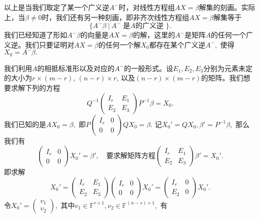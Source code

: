 \vspace{0.5em}

以上是当我们取定了某一个广义逆$A^-$时，对线性方程组$AX = \beta$解集的刻画。实际上，当$\beta \neq 0$时，我们还有另一种刻画，即非齐次线性方程组$AX = \beta$解集等于
$$\{ A^-\beta ~|~ A^- \text{ 是$A$的广义逆 } \}.$$
我们已经知道了形如$A^-\beta$的向量是$AX = \beta$的解，这里的$A^-$是矩阵$A$的任何一个广义逆。我们只要证明对$AX = \beta$的任何一个解$X_0$都存在某个广义逆$A^-,$ 使得$X_0 = A^-\beta.$

我们利用$A$的相抵标准形以及对应的$A^-$的一般形式。设$E_1, E_2, E_3$分别为元素未定的大小为$r \times (m-r)$, $(n-r) \times r$, 以及$(n-r) \times (m-r)$的矩阵。我们想要求解下列的方程
$$Q^{-1} \begin{pmatrix} I_r & E_1 \\ E_2 & E_3 \end{pmatrix} P^{-1} \beta = X_0.$$
我们已知的是$AX_0 = \beta,$ 即$P \begin{pmatrix} I_r & 0 \\ 0 & 0 \end{pmatrix} Q X_0 = \beta.$ 记$X_0' = QX_0, \beta' = P^{-1}\beta,$ 那么我们有
$$\begin{pmatrix} I_r & 0 \\ 0 & 0 \end{pmatrix} X_0' = \beta', \quad \text{要求解矩阵方程} \begin{pmatrix} I_r & E_1 \\ E_2 & E_3 \end{pmatrix} \beta' = X_0'.$$
即求解
$$X_0' = \begin{pmatrix} I_r & E_1 \\ E_2 & E_3 \end{pmatrix} \begin{pmatrix} I_r & 0 \\ 0 & 0 \end{pmatrix} X_0' = \begin{pmatrix} I_r & 0 \\ E_2 & 0 \end{pmatrix} X_0'.$$
令$X_0' = \begin{pmatrix} v_1 \\ v_2 \end{pmatrix},$ 其中$v_1 \in \mathbb{F}^{r \times 1}, v_2 \in \mathbb{F}^{(n-s)\times 1},$ 有
